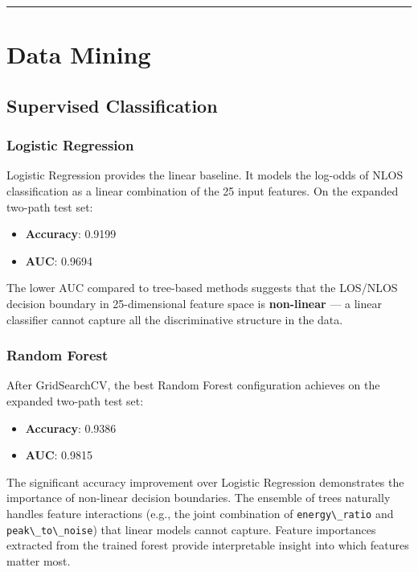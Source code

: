 \documentclass[12pt,a4paper]{article}
\newcommand{\passthrough}[1]{#1}
\providecommand{\passthrough}[1]{#1}
\providecommand{\tightlist}{%
  \setlength{\itemsep}{0pt}\setlength{\parskip}{0pt}}
\begin{document}
\begin{center}\rule{0.5\linewidth}{0.5pt}\end{center}

\section{Data Mining}\label{data-mining}

\subsection{Supervised Classification}\label{supervised-classification}

\subsubsection{Logistic Regression}\label{logistic-regression-1}

Logistic Regression provides the linear baseline. It models the log-odds
of NLOS classification as a linear combination of the 25 input features.
On the expanded two-path test set:

\begin{itemize}
\tightlist
\item
  \textbf{Accuracy}: 0.9199
\item
  \textbf{AUC}: 0.9694
\end{itemize}

The lower AUC compared to tree-based methods suggests that the LOS/NLOS
decision boundary in 25-dimensional feature space is \textbf{non-linear}
--- a linear classifier cannot capture all the discriminative structure
in the data.

\subsubsection{Random Forest}\label{random-forest-1}

After GridSearchCV, the best Random Forest configuration achieves on the
expanded two-path test set:

\begin{itemize}
\tightlist
\item
  \textbf{Accuracy}: 0.9386
\item
  \textbf{AUC}: 0.9815
\end{itemize}

The significant accuracy improvement over Logistic Regression
demonstrates the importance of non-linear decision boundaries. The
ensemble of trees naturally handles feature interactions (e.g., the
joint combination of \passthrough{\lstinline!energy\_ratio!} and
\passthrough{\lstinline!peak\_to\_noise!}) that linear models cannot
capture. Feature importances extracted from the trained forest provide
interpretable insight into which features matter most.
\end{document}
